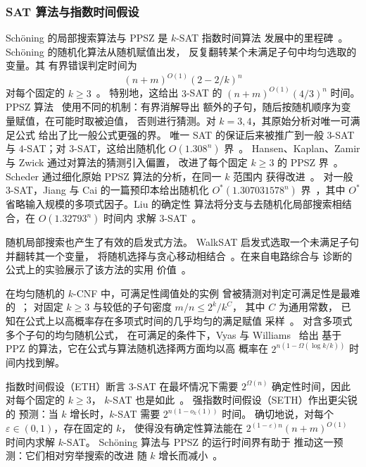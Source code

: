 \documentclass[11pt,reqno]{amsart}
\numberwithin{equation}{section}
\theoremstyle{definition}\newtheorem{definition}[theorem]{定义}
\theoremstyle{remark}\newtheorem{remark}[theorem]{注}
\renewcommand{\le}{\leqslant}
\renewcommand{\ge}{\geqslant}
\begin{document}
\subsubsection{SAT 算法与指数时间假设}\label{subsec:related-sat}
Sch\"oning 的局部搜索算法与 PPSZ 是 $k$-SAT 指数时间算法
发展中的里程碑~\cite{Schon99,PPSZ05}。
Sch\"oning 的随机化算法从随机赋值出发，
反复翻转某个未满足子句中均匀选取的变量。其
有界错误判定时间为
\[
 (n+m)^{O(1)}(2-2/k)^n
\]
对每个固定的 $k\ge3$~\cite[第~2 节]{Schon99}。
特别地，这给出 $3$-SAT 的 $(n+m)^{O(1)}(4/3)^n$ 时间。
PPSZ 算法~\cite{PPSZ05} 使用不同的机制：有界消解导出
额外的子句，随后按随机顺序为变量赋值，在可能时取被迫值，
否则进行猜测。对 $k=3,4$，其原始分析对唯一可满足公式
给出了比一般公式更强的界。
唯一 SAT 的保证后来被推广到一般 $3$-SAT 与
$4$-SAT；对 $3$-SAT，这给出随机化
$O(1.308^n)$ 界~\cite{Hertli14}。
Hansen、Kaplan、Zamir 与 Zwick 通过对算法的猜测引入偏置，
改进了每个固定 $k\ge3$ 的 PPSZ 界~\cite{HKZZ19}。
Scheder 通过细化原始 PPSZ 算法的分析，在同一 $k$ 范围内
获得改进~\cite[定理~1.5]{Scheder24}。
对一般 $3$-SAT，Jiang 与 Cai 的一篇预印本给出随机化
$O^*(1.307031578^n)$ 界~\cite[推论~1.2]{JC26}，其中 $O^*$
省略输入规模的多项式因子。Liu 的确定性
算法将分支与去随机化局部搜索相结合，在 $O(1.32793^n)$ 时间内
求解 $3$-SAT~\cite[定理~21]{Liu18}。

随机局部搜索也产生了有效的启发式方法。
WalkSAT 启发式选取一个未满足子句并翻转其一个变量，
将随机选择与贪心移动相结合~\cite{SKC94}。在来自电路综合与
诊断的公式上的实验展示了该方法的实用
价值~\cite[第~340--342 页，表~4--5]{SKC94}。

在均匀随机的 $k$-CNF 中，可满足性阈值处的实例
曾被猜测对判定可满足性是最难的~\cite[第~1 节]{VW21}；
对固定 $k\ge3$ 与较低的子句密度 $m/n\le 2^k/k^C$，
其中 $C$ 为通用常数，
已知在公式上以高概率存在多项式时间的几乎均匀的满足赋值
采样~\cite[定理~1.2]{CLWYY25}。
对含多项式多个子句的均匀随机公式，
在可满足的条件下，Vyas 与 Williams~\cite[定理~3]{VW21} 给出
基于 PPZ 的算法，它在公式与算法随机选择两方面均以高
概率在 $2^{n(1-\Omega(\log k/k))}$ 时间内找到解。

指数时间假设（ETH）断言 $3$-SAT 在最坏情况下需要
$2^{\Omega(n)}$ 确定性时间，因此对每个固定的 $k\ge3$，
$k$-SAT 也是如此~\cite[定理~1]{IP01}。
强指数时间假设（SETH）作出更尖锐的
预测：当 $k$ 增长时，$k$-SAT 需要 $2^{n(1-o_k(1))}$ 时间。
确切地说，对每个 $\varepsilon\in(0,1)$，存在固定的 $k$，
使得没有确定性算法能在
$2^{(1-\varepsilon)n}(n+m)^{O(1)}$ 时间内求解 $k$-SAT。
Sch\"oning 算法与 PPSZ 的运行时间界有助于
推动这一预测：它们相对穷举搜索的改进
随 $k$ 增长而减小~\cite[开放问题，第~2 项]{IP01}。
\end{document}
